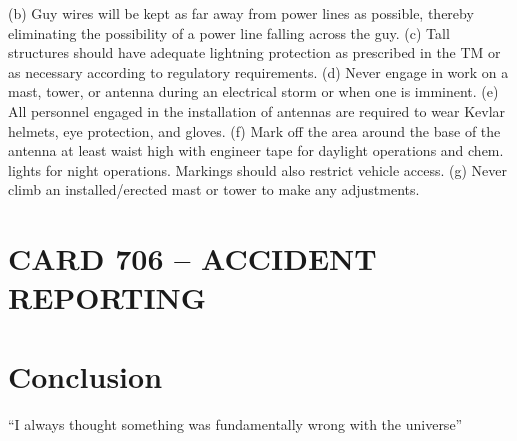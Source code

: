 \documentclass{article}
\begin{document}
\begin{enumerate}
(b)	Guy wires will be kept as far away from power lines as possible, thereby eliminating the possibility of a power line falling across the guy.
(c)	Tall structures should have adequate lightning protection as prescribed in the TM or as necessary according to regulatory requirements.
(d)	Never engage in work on a mast, tower, or antenna during an electrical storm or when one is imminent.
(e)	All personnel engaged in the installation of antennas are required to wear Kevlar helmets, eye protection, and gloves.
(f)	Mark off the area around the base of the antenna at least waist high with engineer tape for daylight operations and chem. lights for night operations. Markings should also restrict vehicle access.
(g)	Never climb an installed/erected mast or tower to make any adjustments.
\end{enumerate}

\newpage
\section*{CARD 706 – ACCIDENT REPORTING}

\section{Conclusion}
``I always thought something was fundamentally wrong with the universe'' \citep{adams1995hitchhiker}



\end{document}
